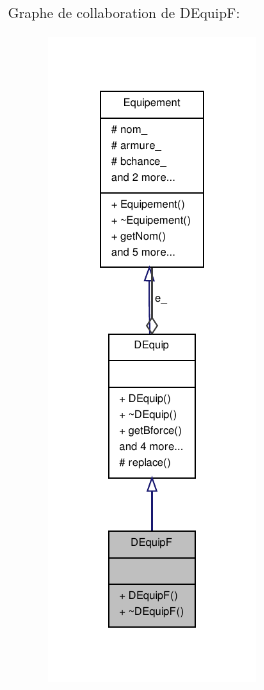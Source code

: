 Graphe de collaboration de D\-Equip\-F\-:
\nopagebreak
\begin{figure}[H]
\begin{center}
\leavevmode
\includegraphics[width=156pt]{class_d_equip_f__coll__graph}
\end{center}
\end{figure}
